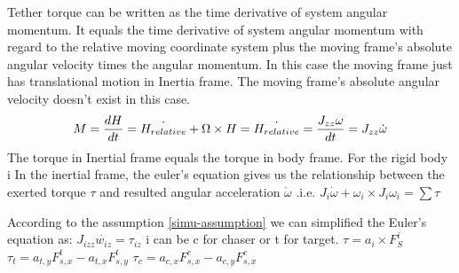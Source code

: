 Tether torque can be written as the time derivative of system angular momentum. It equals the time derivative of system angular momentum with regard to the relative moving coordinate system plus the moving frame's absolute angular velocity times the angular momentum. In this case the moving frame just has translational motion in Inertia frame. The moving frame's absolute angular velocity doesn't exist in this case. 
\begin{equation} M = \frac{dH}{dt} = \dot{H_{relative}} + \Omega \times H\\
		=\dot{H_{relative}} =\frac{J_{zz}\omega}{dt}= J_{zz}\dot{\omega}
\end{equation}
The torque in Inertial frame equals the torque in body frame.
For the rigid body i In the inertial frame, the euler's equation gives us the relationship between the exerted torque $\tau$ and resulted angular acceleration $\dot{\omega}$ .i.e. $J_i\dot{\omega} + \omega_i \times J_i\omega_i=\sum\tau$

According to the assumption \ref{simu-assumption} we can simplified the Euler's equation as: $J_{izz}\dot{w_{iz}}=\tau_{iz}$	i can be c for chaser or t for target.
$\tau=a_i\times F^i_S$	$\tau_t = a_{t,y}F_{s,x}^t - a_{t,x}F_{s,y}^t$	$\tau_c = a_{c,x}F_{s,x}^c - a_{c,y}F_{s,x}^c$

